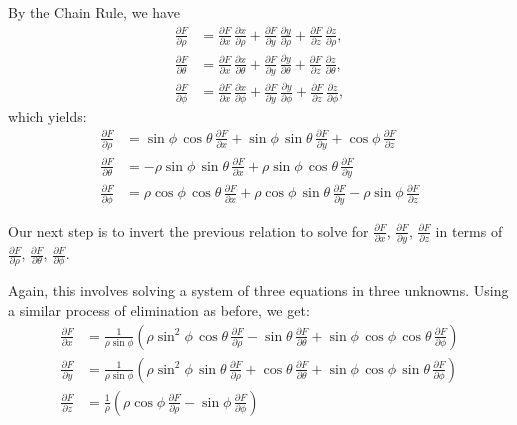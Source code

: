 {{By the Chain Rule, we have
\begin{align*}
 \frac{\partial F}{\partial \rho} &= \frac{\partial F}{\partial x}\,\frac{\partial x}{\partial \rho} +
  \frac{\partial F}{\partial y}\,\frac{\partial y}{\partial \rho} +
  \frac{\partial F}{\partial z}\,\frac{\partial z}{\partial \rho} ,\\
 \frac{\partial F}{\partial \theta} &= \frac{\partial F}{\partial x}\,\frac{\partial x}{\partial \theta} +
  \frac{\partial F}{\partial y}\,\frac{\partial y}{\partial \theta} +
  \frac{\partial F}{\partial z}\,\frac{\partial z}{\partial \theta} ,\\
 \frac{\partial F}{\partial \phi} &= \frac{\partial F}{\partial x}\,\frac{\partial x}{\partial \phi} +
  \frac{\partial F}{\partial y}\,\frac{\partial y}{\partial \phi} +
  \frac{\partial F}{\partial z}\,\frac{\partial z}{\partial \phi} ,
\end{align*}
which yields:
\begin{align}
 \frac{\partial F}{\partial \rho} &= \sin\phi\,\cos\theta\,\frac{\partial F}{\partial x} +
  \sin\phi\,\sin\theta\,\frac{\partial F}{\partial y} + \cos\phi\,\frac{\partial F}{\partial z}\\
 \frac{\partial F}{\partial \theta} &= -\rho\sin\phi\,\sin\theta\,\frac{\partial F}{\partial x} +
  \rho\sin\phi\,\cos\theta\,\frac{\partial F}{\partial y}\\
 \frac{\partial F}{\partial \phi} &= \rho\cos\phi\,\cos\theta\,\frac{\partial F}{\partial x} +
  \rho\cos\phi\,\sin\theta\,\frac{\partial F}{\partial y} - \rho\sin\phi\,\frac{\partial F}{\partial z}
\end{align}

Our next step is to invert the previous relation to solve for $\frac{\partial F}{\partial x}$, $\frac{\partial F}{\partial y}$, $\frac{\partial F}{\partial z}$ in terms of $\frac{\partial F}{\partial \rho}$, $\frac{\partial F}{\partial \theta}$, $\frac{\partial F}{\partial \phi}$.

Again, this involves solving a system of three equations in three unknowns. Using a similar process of elimination as before, we get:
\begin{align}
 \frac{\partial F}{\partial x} &= \frac{1}{\rho\sin\phi}\left( \rho\sin^2\phi\,\cos\theta\,
  \frac{\partial F}{\partial \rho} - \sin\theta\,\frac{\partial F}{\partial \theta} + \sin\phi\,\cos\phi\,\cos\theta\,
  \frac{\partial F}{\partial \phi} \right)\\
 \frac{\partial F}{\partial y} &= \frac{1}{\rho\sin\phi}\left( \rho\sin^2\phi\,\sin\theta\,
  \frac{\partial F}{\partial \rho} + \cos\theta\,\frac{\partial F}{\partial \theta} + \sin\phi\,\cos\phi\,\sin\theta\,
  \frac{\partial F}{\partial \phi} \right)\\
 \frac{\partial F}{\partial z} &= \frac{1}{\rho}\left( \rho\cos\phi\,\frac{\partial F}{\partial \rho} -
  \sin\phi\,\frac{\partial F}{\partial \phi} \right)\label{partials_cart_sphere}
\end{align}

}}
